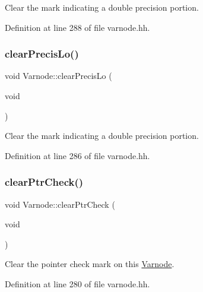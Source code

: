 Clear the mark indicating a double precision portion. 



Definition at line 288 of file varnode.\+hh.

\mbox{\label{class_varnode_a75b4ed13f2045f91e153206b061341e0}} 
\subsubsection{\texorpdfstring{clearPrecisLo()}{clearPrecisLo()}}
{\footnotesize\ttfamily void Varnode\+::clear\+Precis\+Lo (\begin{DoxyParamCaption}\item[{void}]{ }\end{DoxyParamCaption})\hspace{0.3cm}{\ttfamily [inline]}}



Clear the mark indicating a double precision portion. 



Definition at line 286 of file varnode.\+hh.

\mbox{\label{class_varnode_a2a4392f973d2f0dc1fb79d4bc6f3a37d}} 
\subsubsection{\texorpdfstring{clearPtrCheck()}{clearPtrCheck()}}
{\footnotesize\ttfamily void Varnode\+::clear\+Ptr\+Check (\begin{DoxyParamCaption}\item[{void}]{ }\end{DoxyParamCaption})\hspace{0.3cm}{\ttfamily [inline]}}



Clear the pointer check mark on this \mbox{\hyperlink{class_varnode}{Varnode}}. 



Definition at line 280 of file varnode.\+hh.

